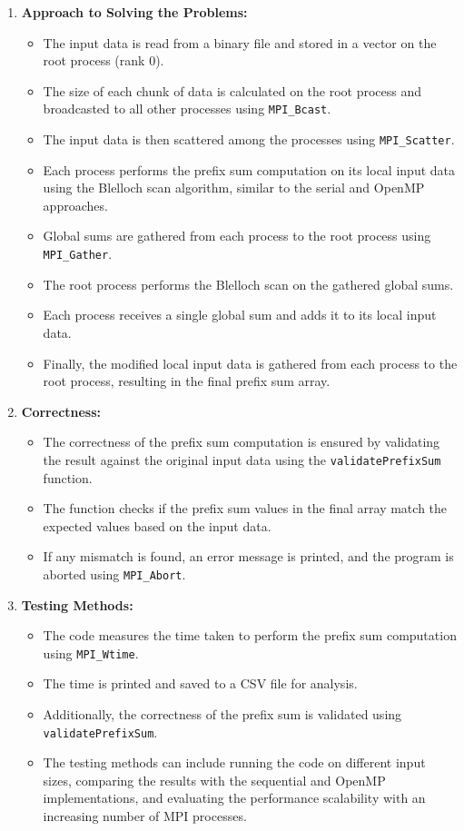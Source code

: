 \begin{enumerate}
  \item \textbf{Approach to Solving the Problems:}
  \begin{itemize}
    \item The input data is read from a binary file and stored in a vector on the root process (rank 0).
    \item The size of each chunk of data is calculated on the root process and broadcasted to all other processes using \lstinline{MPI_Bcast}.
    \item The input data is then scattered among the processes using \lstinline{MPI_Scatter}.
    \item Each process performs the prefix sum computation on its local input data using the Blelloch scan algorithm, similar to the serial and OpenMP approaches.
    \item Global sums are gathered from each process to the root process using \lstinline{MPI_Gather}.
    \item The root process performs the Blelloch scan on the gathered global sums.
    \item Each process receives a single global sum and adds it to its local input data.
    \item Finally, the modified local input data is gathered from each process to the root process, resulting in the final prefix sum array.
  \end{itemize}

  \item \textbf{Correctness:}
  \begin{itemize}
    \item The correctness of the prefix sum computation is ensured by validating the result against the original input data using the \lstinline{validatePrefixSum} function.
    \item The function checks if the prefix sum values in the final array match the expected values based on the input data.
    \item If any mismatch is found, an error message is printed, and the program is aborted using \lstinline{MPI_Abort}.
  \end{itemize}

  \item \textbf{Testing Methods:}
  \begin{itemize}
    \item The code measures the time taken to perform the prefix sum computation using \lstinline{MPI_Wtime}.
    \item The time is printed and saved to a CSV file for analysis.
    \item Additionally, the correctness of the prefix sum is validated using \lstinline{validatePrefixSum}.
    \item The testing methods can include running the code on different input sizes, comparing the results with the sequential and OpenMP implementations, and evaluating the performance scalability with an increasing number of MPI processes.
  \end{itemize}
\end{enumerate}

